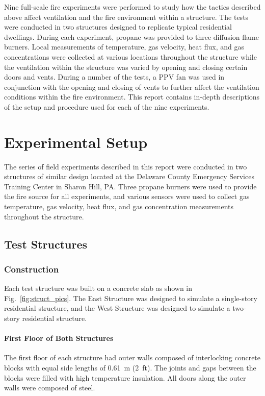 \documentclass[12pt,oneside]{book}
\begin{document}
Nine full-scale fire experiments were performed to study how the tactics described above affect ventilation and the fire environment within a structure. The tests were conducted in two structures designed to replicate typical residential dwellings. During each experiment, propane was provided to three diffusion flame burners. Local measurements of temperature, gas velocity, heat flux, and gas concentrations were collected at various locations throughout the structure while the ventilation within the structure was varied by opening and closing certain doors and vents. During a number of the tests, a PPV fan was used in conjunction with the opening and closing of vents to further affect the ventilation conditions within the fire environment. This report contains in-depth descriptions of the setup and procedure used for each of the nine experiments.


\chapter{Experimental Setup}
\label{chap:Experimental_Setup}
The series of field experiments described in this report were conducted in two structures of similar design located at the Delaware County Emergency Services Training Center in Sharon Hill, PA. Three propane burners were used to provide the fire source for all experiments, and various sensors were used to collect gas temperature, gas velocity, heat flux, and gas concentration measurements throughout the structure.

\section{Test Structures}
\label{sec:Test_Structures}

\subsection{Construction}
\label{sec:construction}
Each test structure was built on a concrete slab as shown in Fig.~\ref{fig:struct_pics}. The East Structure was designed to simulate a single-story residential structure, and the West Structure was designed to simulate a two-story residential structure. 

\subsubsection{First Floor of Both Structures}
The first floor of each structure had outer walls composed of interlocking concrete blocks with equal side lengths of 0.61~m (2~ft). The joints and gaps between the blocks were filled with high temperature insulation. All doors along the outer walls were composed of steel.
\end{document}
